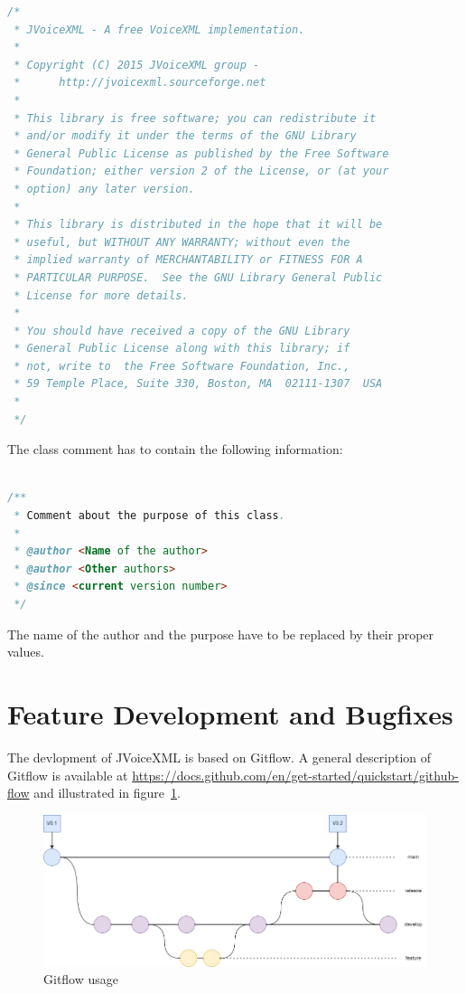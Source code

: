 \documentclass[11pt,a4paper]{article}
\begin{document}
\begin{lstlisting}[language=Java]
/*
 * JVoiceXML - A free VoiceXML implementation.
 *
 * Copyright (C) 2015 JVoiceXML group - 
 *      http://jvoicexml.sourceforge.net
 *
 * This library is free software; you can redistribute it 
 * and/or modify it under the terms of the GNU Library 
 * General Public License as published by the Free Software 
 * Foundation; either version 2 of the License, or (at your 
 * option) any later version.
 *
 * This library is distributed in the hope that it will be 
 * useful, but WITHOUT ANY WARRANTY; without even the 
 * implied warranty of MERCHANTABILITY or FITNESS FOR A 
 * PARTICULAR PURPOSE.  See the GNU Library General Public 
 * License for more details.
 *
 * You should have received a copy of the GNU Library 
 * General Public License along with this library; if 
 * not, write to  the Free Software Foundation, Inc., 
 * 59 Temple Place, Suite 330, Boston, MA  02111-1307  USA
 *
 */
\end{lstlisting}

The class comment has to contain the following information:

\begin{lstlisting}[language=Java]

/**
 * Comment about the purpose of this class.
 *
 * @author <Name of the author>
 * @author <Other authors>
 * @since <current version number>
 */
\end{lstlisting}

The name of the author and the purpose have to be replaced by their proper
values.

\section{Feature Development and Bugfixes}

The devlopment of JVoiceXML is based on Gitflow. A general description of Gitflow is available
at \url{https://docs.github.com/en/get-started/quickstart/github-flow} and illustrated in
figure~\ref{fig:gitflow}.
\begin{figure}
\includegraphics[width=\linewidth]{gitflow.png}
\caption{Gitflow usage}
\label{fig:gitflow}
\end{figure}
\end{document}
